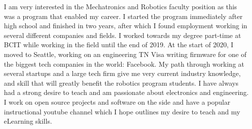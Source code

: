\documentclass[11pt,a4paper,roman]{moderncv}
\begin{document}
I am very interested in the Mechatronics and Robotics faculty position as this was a program that enabled my career. I started the program immediately after high school and finished in two years, after which I found employment working in several different companies and fields. I worked towards my degree part-time at BCIT while working in the field until the end of 2019. At the start of 2020, I moved to Seattle, working on an engineering TN Visa writing firmware for one of the biggest tech companies in the world: Facebook. My path through working at several startups and a large tech firm give me very current industry knowledge, and skill that will greatly benefit the robotics program students. I have always had a strong desire to teach and am passionate about electronics and engineering. I work on open source projects and software on the side and have a popular instructional youtube channel which I hope outlines my desire to teach and my eLearning skills.


\makeletterclosing
\end{document}
